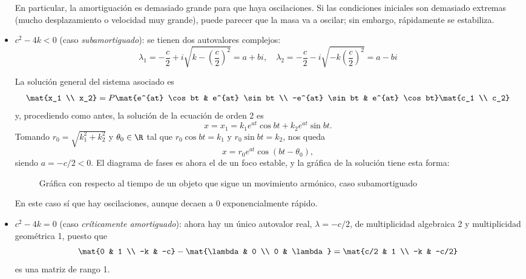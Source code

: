 \documentclass[../ecuaciones_diferenciales.tex]{subfiles}
\begin{document}
\begin{itemize}
	      En particular, la amortiguación es demasiado grande para que haya
	      oscilaciones. Si las condiciones iniciales son demasiado extremas (mucho
	      desplazamiento o velocidad muy grande), puede parecer que la masa va a
	      oscilar; sin embargo, rápidamente se estabiliza.
	\item \(c^2 - 4k < 0\) (caso \emph{subamortiguado}): se tienen dos autovalores
	      complejos:
	      \[\lambda_1 = -\frac{c}{2}+i\sqrt{k-\left(\frac{c}{2}\right)^2} = a + bi, \quad
		      \lambda_2 = -\frac{c}{2}-i\sqrt{-k\left(\frac{c}{2}\right)^2} = a - bi\]

	      La solución general del sistema asociado es
	      \[\mat{x_1 \\ x_2} = P \mat{e^{at} \cos bt & e^{at} \sin bt \\ -e^{at} \sin
		      bt & e^{at} \cos bt} \mat{c_1 \\ c_2}\]
	      y, procediendo como antes, la solución de la ecuación de orden 2 es
	      \[x = x_1 = k_1e^{at} \cos bt + k_2e^{at} \sin bt.\]
	      Tomando \(r_0 = \sqrt{k_1^2+k_2^2}\) y \(\theta_0 \in \R\) tal que \(r_0
	      \cos bt = k_1\) y \(r_0 \sin bt = k_2\), nos queda
	      \[x = r_0e^{at} \cos (bt - \theta_0),\]
	      siendo \(a = -c/2 < 0\). El diagrama de fases es ahora el de un foco
	      estable, y la gráfica de la solución tiene esta forma:
	      \begin{figure}[ht]
		      \centering
			\caption{Gráfica con respecto al tiempo de un objeto que
			  sigue un movimiento armónico, caso subamortiguado}
	      \end{figure}

	      En este caso sí que hay oscilaciones, aunque decaen a 0 exponencialmente rápido.

	\item \(c^2-4k=0\) (caso \emph{críticamente amortiguado}): ahora hay un único
	      autovalor real, \(\lambda = -c/2\), de multiplicidad algebraica 2 y
	      multiplicidad geométrica 1, puesto que
	      \[\mat{0 & 1 \\ -k & -c} - \mat{\lambda & 0 \\ 0 & \lambda} = \mat{c/2 & 1
			      \\ -k & -c/2}\]
	      es una matriz de rango 1.


\end{itemize}
\end{document}
